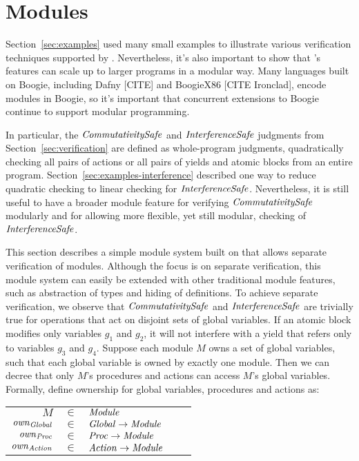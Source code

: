 \section{Modules}
\label{sec:modules}

Section~\ref{sec:examples} used many small examples to illustrate various verification techniques supported by \civl.
Nevertheless, it's also important to show that \civl's features can scale up to larger programs in a modular way.
Many languages built on Boogie, including Dafny [CITE] and BoogieX86 [CITE Ironclad], encode modules in Boogie,
so it's important that concurrent extensions to Boogie continue to support modular programming.

In particular, the $\mathit{CommutativitySafe}$ and $\mathit{InterferenceSafe}$ judgments from Section~\ref{sec:verification} are defined as whole-program judgments,
quadratically checking all pairs of actions or all pairs of yields and atomic blocks from an entire program.
Section~\ref{sec:examples-interference} described one way to reduce quadratic checking to linear checking for $\mathit{InterferenceSafe}$.
Nevertheless, it is still useful to have a broader module feature for verifying $\mathit{CommutativitySafe}$ modularly and for allowing more flexible,
yet still modular, checking of $\mathit{InterferenceSafe}$.

This section describes a simple module system built on \civl that allows separate verification of modules.
Although the focus is on separate verification,
this module system can easily be extended with other traditional module features,
such as abstraction of types and hiding of definitions.
To achieve separate verification,
we observe that $\mathit{CommutativitySafe}$ and $\mathit{InterferenceSafe}$ are trivially true for operations that act on disjoint sets of global variables.
If an atomic block modifies only variables $g_1$ and $g_2$, it will not interfere with a yield that refers only to variables $g_3$ and $g_4$.
Suppose each module $M$ owns a set of global variables, such that each global variable is owned by exactly one module.
Then we can decree that only $M$'s procedures and actions can access $M$'s global variables.
Formally, define ownership for global variables, procedures and actions as:

\begin{tabular}{rclcl}
$M$ & $\in$ & $\mathit{Module}$ \\
$\mathit{own}_{\mathit{Global}}$ & $\in$ & $\mathit{Global} \rightarrow \mathit{Module}$ \\
$\mathit{own}_{\mathit{Proc}}$ & $\in$ & $\mathit{Proc} \rightarrow \mathit{Module}$ \\
$\mathit{own}_{\mathit{Action}}$ & $\in$ & $\mathit{Action} \rightarrow \mathit{Module}$ \\
\end{tabular}

